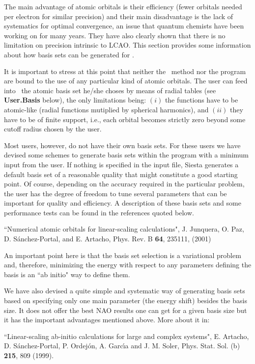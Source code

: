 The main advantage of atomic orbitals is their efficiency (fewer orbitals
needed per electron for similar precision)
and their main disadvantage is the lack of systematics for optimal
convergence, an issue that quantum chemists have been working on for
many years. They have also clearly shown that there
is no limitation on precision intrinsic to LCAO.
This section provides some information about how basis sets can be
generated for \siesta.

It is important to stress at this point that neither the \siesta\
method nor the program
are bound to the use of any particular kind of atomic orbitals. The
user can feed into \siesta\ the atomic basis set he/she choses by
means of radial tables (see \textbf{User.Basis} below), the
only limitations being: $(i)$ the functions have to be atomic-like (radial
functions mutiplied by spherical harmonics), and $(ii)$ they have to be
of finite support, i.e., each orbital becomes strictly zero beyond some
cutoff radius chosen by the user.

Most users, however, do not have their own basis sets. For these users
we have devised some schemes to generate basis sets within the program
with a minimum input from the user.  If nothing is specified in the
input file, Siesta generates a default basis set of a reasonable
quality that might constitute a good starting point.  Of course,
depending on the accuracy required in the particular problem, the user
has the degree of freedom to tune several parameters that can be
important for quality and efficiency. A description of these basis
sets and some performance tests can be found in the references quoted
below.

\noindent
``Numerical atomic orbitals for linear-scaling calculations",
J. Junquera, O. Paz, D. S\'anchez-Portal, and E. Artacho, Phys. Rev. B
\textbf{64}, 235111, (2001)

An important point here is that the basis set selection is a
variational problem and, therefore, minimizing the energy with respect
to any parameters defining the basis is an ``ab initio" way to
define them.

We have also devised a quite simple and systematic way of generating
basis sets based on specifying only one main parameter (the energy shift)
besides the basis size. It does not offer the best NAO results one can get
for a given basis size but it has the important advantages mentioned above.
More about it in:

\noindent
``Linear-scaling ab-initio calculations for large and complex systems",
E. Artacho, D. S\'anchez-Portal, P. Ordej\'on, A. Garc\'{\i}a and
J. M. Soler, Phys. Stat. Sol. (b) \textbf{215}, 809 (1999).

